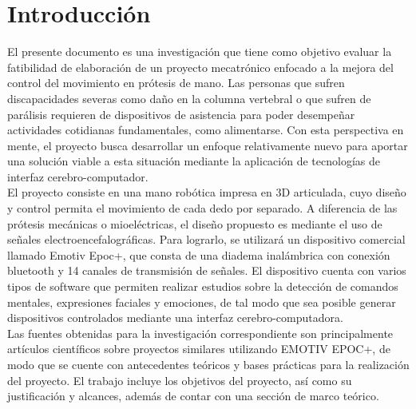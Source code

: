 \documentclass[11pt]{book}
\begin{document}
\chapter*{Introducción}

\pagestyle{plain}

El presente documento es una investigación que tiene como objetivo evaluar la fatibilidad de elaboración de un proyecto mecatrónico enfocado a la mejora del control del movimiento en prótesis de mano. Las personas que sufren discapacidades severas como daño en la columna vertebral o que sufren de parálisis requieren de dispositivos de asistencia para poder desempeñar actividades cotidianas fundamentales, como alimentarse. Con esta perspectiva en mente, el proyecto busca desarrollar un enfoque relativamente nuevo para aportar una solución viable a esta situación mediante la aplicación de tecnologías de interfaz cerebro-computador. \\
El proyecto consiste en una mano robótica impresa en 3D articulada, cuyo diseño y control permita el movimiento de cada dedo por separado. A diferencia de las prótesis mecánicas o mioeléctricas, el diseño propuesto es mediante el uso de señales electroencefalográficas. Para lograrlo, se utilizará un dispositivo comercial llamado Emotiv Epoc+, que consta de una diadema inalámbrica con conexión bluetooth y 14 canales de transmisión de señales. El dispositivo cuenta con varios tipos de software que permiten realizar estudios sobre la detección de comandos mentales, expresiones faciales y emociones, de tal modo que sea posible generar dispositivos controlados mediante una interfaz cerebro-computadora.\\
Las fuentes obtenidas para la investigación correspondiente son principalmente artículos científicos sobre proyectos similares utilizando EMOTIV EPOC+, de modo que se cuente con antecedentes teóricos y bases prácticas para la realización del proyecto.
El trabajo incluye los objetivos del proyecto, así como su justificación y alcances, además de contar con una sección de marco teórico. 



\tableofcontents


\mainmatter %
\pagestyle{headings}
\end{document}
